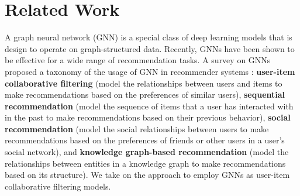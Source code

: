 \documentclass{article}
\begin{document}
\section{Related Work} 


A graph neural network (GNN) is a special class of deep learning models that is design to operate on graph-structured data. Recently, GNNs have been shown to be effective for a wide range of recommendation tasks. A survey on GNNs proposed a taxonomy of the usage of GNN in recommender systems \cite{survey}: \textbf{user-item collaborative filtering} (model the relationships between users and items to make recommendations based on the preferences of similar users), \textbf{sequential recommendation} (model the sequence of items that a user has interacted with in the past to make recommendations based on their previous behavior), \textbf{social recommendation} (model the social relationships between users to make recommendations based on the preferences of friends or other users in a user's social network), and \textbf{knowledge graph-based recommendation} (model the relationships between entities in a knowledge graph to make recommendations based on its structure). We take on the approach to employ GNNs as user-item collaborative filtering models. 

\end{document}
